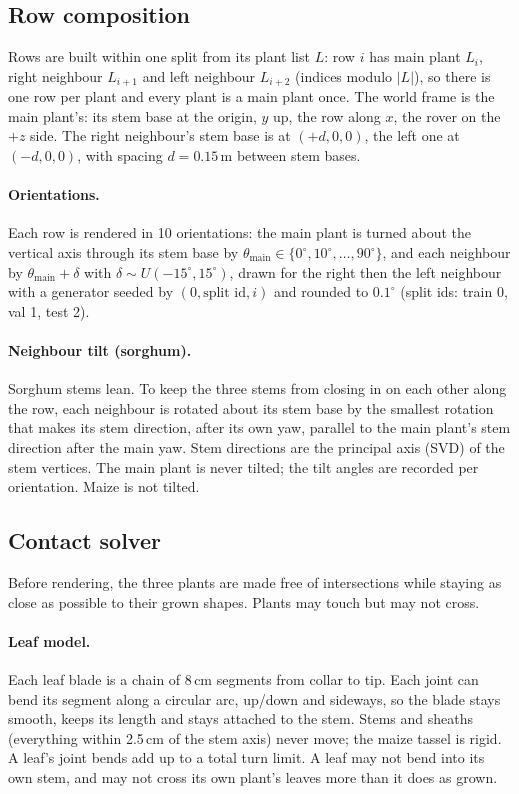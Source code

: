 \documentclass[11pt]{article}
\begin{document}
\subsection{Row composition}
Rows are built within one split from its plant list $L$: row $i$ has main plant $L_i$, right neighbour $L_{i+1}$ and left
neighbour $L_{i+2}$ (indices modulo $|L|$), so there is one row per plant and every plant is a main plant once. The world
frame is the main plant's: its stem base at the origin, $y$ up, the row along $x$, the rover on the $+z$ side. The right
neighbour's stem base is at $(+d,0,0)$, the left one at $(-d,0,0)$, with spacing $d=0.15$\,m between stem bases.

\paragraph{Orientations.} Each row is rendered in 10 orientations: the main plant is turned about the vertical axis
through its stem base by $\theta_\text{main}\in\{0^\circ,10^\circ,\dots,90^\circ\}$, and each neighbour by
$\theta_\text{main}+\delta$ with $\delta\sim U(-15^\circ,15^\circ)$, drawn for the right then the left neighbour with a
generator seeded by $(0,\text{split id},i)$ and rounded to $0.1^\circ$ (split ids: train 0, val 1, test 2).

\paragraph{Neighbour tilt (sorghum).} Sorghum stems lean. To keep the three stems from closing in on each other along
the row, each neighbour is rotated about its stem base by the smallest rotation that makes its stem direction, after its
own yaw, parallel to the main plant's stem direction after the main yaw. Stem directions are the principal axis (SVD) of
the stem vertices. The main plant is never tilted; the tilt angles are recorded per orientation. Maize is not tilted.

\subsection{Contact solver}
Before rendering, the three plants are made free of intersections while staying as close as possible to their grown
shapes. Plants may touch but may not cross.

\paragraph{Leaf model.} Each leaf blade is a chain of 8\,cm segments from collar to tip. Each joint can bend its segment
along a circular arc, up/down and sideways, so the blade stays smooth, keeps its length and stays attached to the stem.
Stems and sheaths (everything within 2.5\,cm of the stem axis) never move; the maize tassel is rigid. A leaf's joint
bends add up to a total turn limit. A leaf may not bend into its own stem, and may not cross its own plant's leaves more
than it does as grown.
\end{document}
